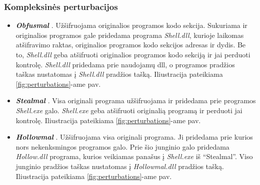 \subsubsection{Kompleksinės perturbacijos}\label{sec:literature:perturbations:complex}
\begin{itemize}
    \item \textbf{\textit{Obfusmal}} \cite{zhongMalFoxCamouflagedAdversarial2024}. Užšifruojama originalios programos kodo sekcija. Sukuriama ir originalios programos gale pridedama programa \textit{Shell.dll}, kurioje laikomas atšifravimo raktas, originalios programos kodo sekcijos adresas ir dydis. Be to, \textit{Shell.dll} geba atšifruoti originalios programos kodo sekciją ir jai perduoti kontrolę. \textit{Shell.dll} pridedama prie naudojamų \acs{dll}, o programos pradžios taškas nustatomas į \textit{Shell.dll} pradžios tašką. Iliustracija pateikiama \ref{fig:perturbations}-ame pav.
    \item \textbf{\textit{Stealmal}} \cite{zhongMalFoxCamouflagedAdversarial2024}. Visa originali programa užšifruojama ir pridedama prie programos \textit{Shell.exe} galo. \textit{Shell.exe} geba atšifruoti originalią programą ir perduoti jai kontrolę. Iliustracija pateikiama \ref{fig:perturbations}-ame pav.
    \item \textbf{\textit{Hollowmal}} \cite{zhongMalFoxCamouflagedAdversarial2024}. Užšifruojama visa originali programa. Ji pridedama prie kurios nors nekenksmingos programos galo. Prie šio junginio galo pridedama \textit{Hollow.dll} programa, kurios veikiamas panašus į \textit{Shell.exe} iš \enquote{Stealmal}. Viso junginio pradžios taškas nustatomas į \textit{Hollowmal.dll} pradžios tašką. Iliustracija pateikiama \ref{fig:perturbations}-ame pav.
\end{itemize}
